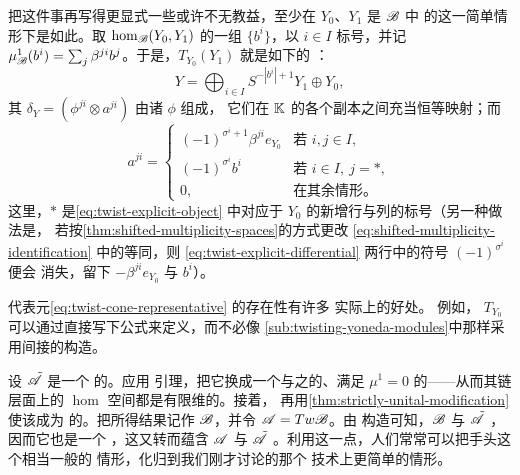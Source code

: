 \begin{remark}\label{thm:twist-explicit-representative}
把这件事再写得更显式一些或许不无教益，至少在 $Y_0$、$Y_1$ 是 $\mathscr{B}$ 中%
\trObject{}的这一简单情形下是如此。取 $\hom_{\mathscr{B}}(Y_0,Y_1)$ 的一组%
\trBasis{} $\{b^i\}$，以 $i\in I$ 标号，并记
$\mu^1_{\mathscr{B}}(b^i)=\sum_j\beta^{ji}b^j$。于是，$T_{Y_0}(Y_1)$ 就是如下的%
\trTwistedComplex：
\begin{equation}\label{eq:twist-explicit-object}
Y=\bigoplus_{i\in I}S^{-|b^i|+1}Y_1\oplus Y_0,
\end{equation}
其\trDifferential{} $\delta_Y=(\phi^{ji}\otimes a^{ji})$ 由诸 $\phi$ 组成，
它们在 $\mathbb{K}$ 的各个\trSuspension{}副本之间充当恒等映射；而
\begin{equation}\label{eq:twist-explicit-differential}
a^{ji}=
\begin{cases}
(-1)^{\sigma^i+1}\beta^{ji}e_{Y_0} & \text{若 } i,j\in I,\\
(-1)^{\sigma^i}b^i & \text{若 } i\in I,\ j=\ast,\\
0, & \text{在其余情形。}
\end{cases}
\end{equation}
这里，$\ast$ 是\eqref{eq:twist-explicit-object} 中对应于 $Y_0$ %
\trDirectSummand{}的新增行与列的标号（另一种做法是，
若按\cref{thm:shifted-multiplicity-spaces}的方式更改
\eqref{eq:shifted-multiplicity-identification} 中的等同，则
\eqref{eq:twist-explicit-differential} 两行中的符号 $(-1)^{\sigma^i}$ 便会
消失，留下 $-\beta^{ji}e_{Y_0}$ 与 $b^i$）。
\end{remark}

\trCanonical{}代表元\eqref{eq:twist-cone-representative} 的存在性有许多
实际上的好处。
例如，\trAFunctor{} $T_{Y_0}$ 可以通过直接写下公式来定义，而不必像%
\cref{sub:twisting-yoneda-modules}中那样采用间接的构造。

\begin{remark}\label{thm:c-finite-reduction}
设 $\tilde{\mathscr{A}}$ 是一个 \trCfinite{}的\trTriangulated{}\trACategory。应用%
\trPerturbation{}引理，把它换成一个与之\trQuasiisomorphic{}的、满足
$\mu^1=0$ 的\trCategory——从而其链层面上的 $\hom$ 空间都是有限维的。接着，
再用\cref{thm:strictly-unital-modification}使该\trCategory{}成为%
\trStrictlyUnital{}的。把所得结果记作 $\mathscr{B}$，并令 $\mathscr{A}=Tw\mathscr{B}$。由
构造可知，$\mathscr{B}$ 与 $\tilde{\mathscr{A}}$ \trQuasiisomorphic，因而它也是一个%
\trTriangulated{}\trACategory{}，这又转而蕴含 $\mathscr{A}$ 与 $\tilde{\mathscr{A}}$
\trQuasiequivalence。利用这一点，人们常常可以把手头这个相当一般的%
\trCfinite{}\trTriangulated{}\trACategory{}情形，化归到我们刚才讨论的那个
技术上更简单的情形。
\end{remark}

